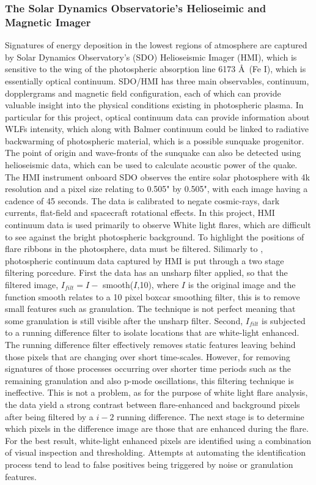 \documentclass[11pt]{article}
\begin{document}
\subsubsection{The Solar Dynamics Observatorie's Helioseimic and Magnetic Imager}
Signatures of energy deposition in the lowest regions of atmosphere are captured by Solar Dynamics Observatory's (SDO) Helioseismic Imager (HMI), which is sensitive to the wing of the photospheric absorption line 6173 \AA\ (Fe I), which is essentially optical continuum. SDO/HMI has three main observables, continuum, dopplergrams and magnetic field configuration, each of which can provide valuable insight into the physical conditions existing in photospheric plasma. In particular for this project, optical continuum data can provide information about WLFs intensity, which along with Balmer continuum could be linked to radiative backwarming of photospheric material, which is a possible sunquake progenitor. The point of origin and wave-fronts of the sunquake can also be detected using helioseismic data, which can be used to calculate acoustic power of the quake.
The HMI instrument onboard SDO observes the entire solar photosphere with 4k resolution and a pixel size relating to 0.505" by 0.505", with each image having a cadence of 45 seconds. The data is calibrated to negate cosmic-rays, dark currents, flat-field and spacecraft rotational effects. In this project, HMI continuum data is used primarily to observe White light flares, which are difficult to see against the bright photospheric background. To highlight the positions of flare ribbons in the photosphere, data must be filtered. Silimarly to \cite{2014ApJ...783...98K}, photospheric continuum data captured by HMI is put through a two stage filtering porcedure. First the data has an unsharp filter applied, so that the filtered image, $I_{filt}=I-$ smooth($I$,10), where $I$ is the original image and the function smooth relates to a 10 pixel boxcar smoothing filter, this is to remove small features such as granulation. The technique is not perfect meaning that some granulation is still visible after the unsharp filter. Second, $I_{filt}$ is subjected to a running difference filter to isolate locations that are white-light enhanced. The running difference filter effectively removes static features leaving behind those pixels that are changing over short time-scales. However, for removing signatures of those processes occurring over shorter time periods such as the remaining granulation and also p-mode oscillations, this filtering technique is ineffective. This is not a problem, as for the purpose of white light flare analysis, the data yield a strong contrast between flare-enhanced and background pixels after being filtered by a $i-2$ running difference. The next stage is to determine which pixels in the difference image are those that are enhanced during the flare. For the best result, white-light enhanced pixels are identified using a combination of visual inspection and thresholding. Attempts at automating the identification process tend to lead to false positives being triggered by noise or granulation features. \\
\end{document}
